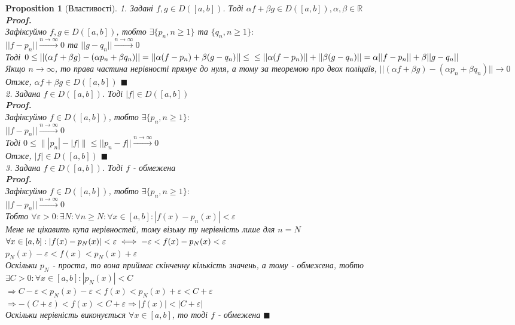 \documentclass[a4paper, 14pt]{extarticle}
\def\bigline{\vspace{5mm}\\}
\theoremstyle{theoremdd}
\theoremstyle{theoremdd}
\theoremstyle{theoremdd}
\theoremstyle{theoremdd}
\theoremstyle{theoremdd}
\newtheorem{proposition}[theorem]{Proposition}
\theoremstyle{theoremdd}
\theoremstyle{theoremdd}
\theoremstyle{theoremdd}
\newenvironment{pfNoTh}{\textbf{Proof. \\}}{$\blacksquare$}
\begin{document}
\begin{proposition}[Властивості]
1. Задані $f,g \in D([a,b])$. Тоді $\alpha f + \beta g \in D([a,b]), \alpha,\beta \in \mathbb{R}$\\
\begin{pfNoTh}
Зафіксуймо $f,g \in D([a,b])$, тобто $\exists \{p_n, n \geq 1\}$ та $\{q_n, n \geq 1\}:$\\
$||f-p_n|| \overset{n \to \infty}{\longrightarrow} 0$ та $||g-q_n|| \overset{n \to \infty}{\longrightarrow} 0$\\
Тоді $0 \leq ||(\alpha f + \beta g) - (\alpha p_n + \beta q_n)|| = ||\alpha(f-p_n) + \beta(g-q_n)|| \leq \\ \leq ||\alpha(f-p_n)|| + ||\beta(g-q_n)|| = \alpha ||f-p_n|| + \beta ||g-q_n||$\\
Якщо $n \to \infty$, то права частина нерівності прямує до нуля, а тому за теоремою про двох поліцаїв, $||(\alpha f + \beta g) - (\alpha p_n + \beta q_n)|| \to 0$\\
Отже, $\alpha f + \beta g \in D([a,b])$ 
\end{pfNoTh}
\bigline

2. Задана $f \in D([a,b])$. Тоді $|f| \in D([a,b])$\\
\begin{pfNoTh}
Зафіксуймо $f \in D([a,b])$, тобто $\exists \{p_n, n \geq 1\}:$\\
$||f-p_n|| \overset{n \to \infty}{\longrightarrow} 0$\\
Тоді $0 \leq \lVert |p_n| - |f| \rVert \leq ||p_n - f|| \overset{n \to \infty}{\longrightarrow} 0$\\
Отже, $|f| \in D([a,b])$
\end{pfNoTh}
\bigline

3. Задана $f \in D([a,b])$. Тоді $f$ - обмежена\\
\begin{pfNoTh}
Зафіксуймо $f \in D([a,b])$, тобто $\exists \{p_n, n \geq 1\}:$\\
$||f-p_n|| \overset{n \to \infty}{\longrightarrow} 0$\\
Тобто $\forall \varepsilon > 0: \exists N: \forall n \geq N: \forall x \in [a,b]: |f(x) - p_n(x)| < \varepsilon$\\
Мене не цікавить купа нерівностей, тому візьму ту нерівність лише для $n = N$\\
$\forall x \in [a,b]: \abs{f(x) - p_N(x)} < \varepsilon \iff  -\varepsilon < f(x) - p_N(x) < \varepsilon$\\
$p_N(x) - \varepsilon < f(x) < p_N(x) + \varepsilon$\\
Оскільки $p_N$ - проста, то вона приймає скінченну кількість значень, а тому - обмежена, тобто\\
$\exists C > 0: \forall x \in [a,b]: |p_N(x)| < C$\\
$\Rightarrow C - \varepsilon < p_N(x) - \varepsilon < f(x) < p_N(x) + \varepsilon < C + \varepsilon$\\
$\Rightarrow -(C + \varepsilon) < f(x) < C + \varepsilon \Rightarrow |f(x)| < |C + \varepsilon|$\\
Оскільки нерівність виконується $\forall x \in [a,b]$, то тоді $f$ - обмежена
\end{pfNoTh}
\bigline


\end{proposition}
\end{document}

